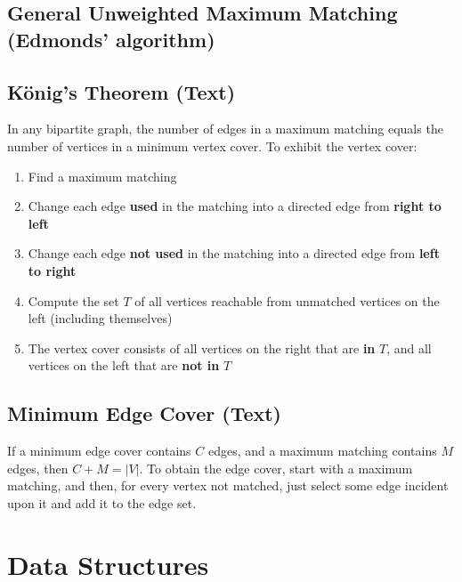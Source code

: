 \documentclass[9pt]{extarticle}
\begin{document}
\begin{multicols*}{3}
\subsection{General Unweighted Maximum Matching (Edmonds' algorithm)}


\subsection{K\"onig's Theorem (Text)} %
In any bipartite graph, the number of edges in a maximum matching equals the
number of vertices in a minimum vertex cover. To exhibit the vertex cover:
\begin{enumerate}
\item Find a maximum matching
\item Change each edge \textbf{used} in the matching into a directed edge from
\textbf{right to left}
\item Change each edge \textbf{not used} in the matching into a directed edge
from \textbf{left to right}
\item Compute the set $T$ of all vertices reachable from unmatched vertices on
the left (including themselves)
\item The vertex cover consists of all vertices on the right that are
\textbf{in} $T$, and all vertices on the left that are \textbf{not in} $T$
\end{enumerate}

\subsection{Minimum Edge Cover (Text)} %
If a minimum edge cover contains $C$ edges, and a maximum matching contains $M$
edges, then $C + M = |V|$. To obtain the edge cover, start with a maximum
matching, and then, for every vertex not matched, just select some edge
incident upon it and add it to the edge set. 


\section{Data Structures}

% 


\end{multicols*}
\end{document}
